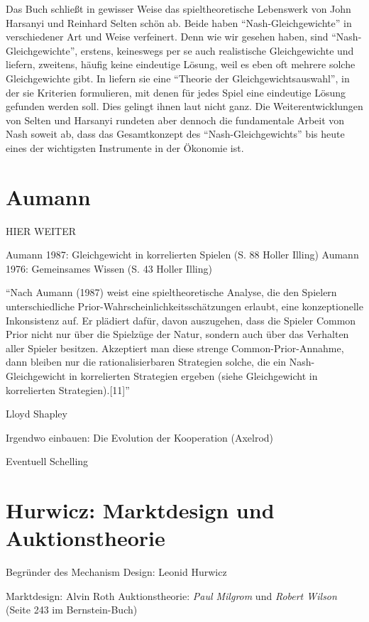 Das Buch \textcite{Harsanyi1988} schließt in gewisser Weise das spieltheoretische Lebenswerk von John Harsanyi und Reinhard Selten schön ab. Beide haben "`Nash-Gleichgewichte"' in verschiedener Art und Weise verfeinert. Denn wie wir gesehen haben, sind "`Nash-Gleichgewichte"', erstens, keineswegs per se auch realistische Gleichgewichte und liefern, zweitens, häufig keine eindeutige Lösung, weil es eben oft mehrere solche Gleichgewichte gibt. In \textcite{Harsanyi1988} liefern sie eine "`Theorie der Gleichgewichtsauswahl"', in der sie Kriterien formulieren, mit denen für jedes Spiel eine eindeutige Lösung gefunden werden soll. Dies gelingt ihnen laut \textcite[S. 134]{Holler2005} nicht ganz. Die Weiterentwicklungen von Selten und Harsanyi rundeten aber dennoch die fundamentale Arbeit von Nash soweit ab, dass das Gesamtkonzept des "`Nash-Gleichgewichts"' bis heute eines der wichtigsten Instrumente in der Ökonomie ist.


\section{Aumann} HIER WEITER

Aumann 1987: Gleichgewicht in korrelierten Spielen (S. 88 Holler Illing) Aumann 1976: Gemeinsames Wissen (S. 43 Holler Illing)

"`Nach Aumann (1987) weist eine spieltheoretische Analyse, die den Spielern unterschiedliche Prior-Wahrscheinlichkeitsschätzungen erlaubt, eine konzeptionelle Inkonsistenz auf. Er plädiert dafür, davon auszugehen, dass die Spieler Common Prior nicht nur über die Spielzüge der Natur, sondern auch über das Verhalten aller Spieler besitzen. Akzeptiert man diese strenge Common-Prior-Annahme, dann bleiben nur die rationalisierbaren Strategien solche, die ein Nash-Gleichgewicht in korrelierten Strategien ergeben (siehe Gleichgewicht in korrelierten Strategien).[11]"'

Lloyd Shapley

Irgendwo einbauen: Die Evolution der Kooperation (Axelrod)

Eventuell Schelling

\section{Hurwicz: Marktdesign und Auktionstheorie}



Begründer des Mechanism Design: Leonid Hurwicz

Marktdesign: Alvin Roth   
Auktionstheorie: \textit{Paul Milgrom} und \textit{Robert Wilson} (Seite 243 im Bernstein-Buch)



